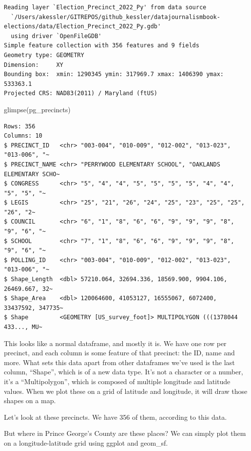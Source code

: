 \documentclass[
  letterpaper,
  DIV=11,
  numbers=noendperiod]{scrreprt}
\newenvironment{Shaded}{\begin{snugshade}}{\end{snugshade}}
\newcommand{\FunctionTok}[1]{\textcolor[rgb]{0.28,0.35,0.67}{#1}}
\newcommand{\NormalTok}[1]{\textcolor[rgb]{0.00,0.23,0.31}{#1}}
\begin{document}
\begin{verbatim}
Reading layer `Election_Precinct_2022_Py' from data source 
  `/Users/akessler/GITREPOS/github_kessler/datajournalismbook-elections/data/Election_Precinct_2022_Py.gdb' 
  using driver `OpenFileGDB'
Simple feature collection with 356 features and 9 fields
Geometry type: GEOMETRY
Dimension:     XY
Bounding box:  xmin: 1290345 ymin: 317969.7 xmax: 1406390 ymax: 533363.1
Projected CRS: NAD83(2011) / Maryland (ftUS)
\end{verbatim}

\begin{Shaded}
\begin{Highlighting}[]
\FunctionTok{glimpse}\NormalTok{(pg\_precincts)}
\end{Highlighting}
\end{Shaded}

\begin{verbatim}
Rows: 356
Columns: 10
$ PRECINCT_ID   <chr> "003-004", "010-009", "012-002", "013-023", "013-006", "~
$ PRECINCT_NAME <chr> "PERRYWOOD ELEMENTARY SCHOOL", "OAKLANDS ELEMENTARY SCHO~
$ CONGRESS      <chr> "5", "4", "4", "5", "5", "5", "5", "4", "4", "5", "5", "~
$ LEGIS         <chr> "25", "21", "26", "24", "25", "23", "25", "25", "26", "2~
$ COUNCIL       <chr> "6", "1", "8", "6", "6", "9", "9", "9", "8", "9", "6", "~
$ SCHOOL        <chr> "7", "1", "8", "6", "6", "9", "9", "9", "8", "9", "6", "~
$ POLLING_ID    <chr> "003-004", "010-009", "012-002", "013-023", "013-006", "~
$ Shape_Length  <dbl> 57210.064, 32694.336, 18569.900, 9904.106, 26469.667, 32~
$ Shape_Area    <dbl> 120064600, 41053127, 16555067, 6072400, 33437592, 347735~
$ Shape         <GEOMETRY [US_survey_foot]> MULTIPOLYGON (((1378044 433..., MU~
\end{verbatim}

This looks like a normal dataframe, and mostly it is. We have one row
per precinct, and each column is some feature of that precinct: the ID,
name and more. What sets this data apart from other dataframes we've
used is the last column, ``Shape'', which is of a new data type. It's
not a character or a number, it's a ``Multipolygon'', which is composed
of multiple longitude and latitude values. When we plot these on a grid
of latitude and longitude, it will draw those shapes on a map.

Let's look at these precincts. We have 356 of them, according to this
data.

But where in Prince George's County are these places? We can simply plot
them on a longitude-latitude grid using ggplot and geom\_sf.
\end{document}
